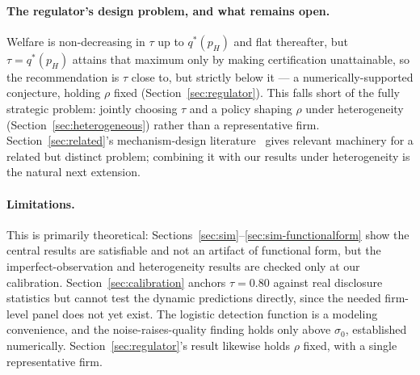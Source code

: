 \paragraph{The regulator's design problem, and what remains open.} Welfare is non-decreasing in $\tau$ up to $q^*(p_H)$ and flat thereafter, but $\tau=q^*(p_H)$ attains that maximum only by making certification unattainable, so the recommendation is $\tau$ close to, but strictly below it — a numerically-supported conjecture, holding $\rho$ fixed (Section~\ref{sec:regulator}). This falls short of the fully strategic problem: jointly choosing $\tau$ and a policy shaping $\rho$ under heterogeneity (Section~\ref{sec:heterogeneous}) rather than a representative firm. Section~\ref{sec:related}'s mechanism-design literature~\cite{machostadler2006optimal,huang2024zetar,varas2020random} gives relevant machinery for a related but distinct problem; combining it with our results under heterogeneity is the natural next extension.

\paragraph{Limitations.} This is primarily theoretical: Sections~\ref{sec:sim}--\ref{sec:sim-functionalform} show the central results are satisfiable and not an artifact of functional form, but the imperfect-observation and heterogeneity results are checked only at our calibration. Section~\ref{sec:calibration} anchors $\tau=0.80$ against real disclosure statistics but cannot test the dynamic predictions directly, since the needed firm-level panel does not yet exist. The logistic detection function is a modeling convenience, and the noise-raises-quality finding holds only above $\sigma_0$, established numerically. Section~\ref{sec:regulator}'s result likewise holds $\rho$ fixed, with a single representative firm.
